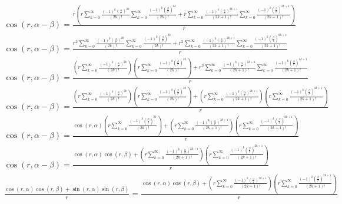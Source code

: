 \documentclass[a4paper,12pt]{report}
\begin{document}
\begin{landscape}
{\begin{gather}
\cos(r,\alpha - \beta) = \frac{r \left(r \sum \limits_{k=0}^{\infty} \frac{(-1)^k \left(\frac{\alpha}{r}\right)^{2k}}{(2k)!} \sum \limits_{k=0}^{\infty} \frac{(-1)^k \left(\frac{\beta}{r}\right)^{2k}}{(2k)!} + r \sum \limits_{k=0}^{\infty} \frac{(-1)^k \left(\frac{\alpha}{r}\right)^{2k+1}}{(2k+1)!} \sum \limits_{k=0}^{\infty} \frac{(-1)^k \left(\frac{\beta}{r}\right)^{2k+1}}{(2k+1)!}\right)}{r} \\
\cos(r,\alpha - \beta) = \frac{r^2 \sum \limits_{k=0}^{\infty} \frac{(-1)^k \left(\frac{\alpha}{r}\right)^{2k}}{(2k)!} \sum \limits_{k=0}^{\infty} \frac{(-1)^k \left(\frac{\beta}{r}\right)^{2k}}{(2k)!} + r^2 \sum \limits_{k=0}^{\infty} \frac{(-1)^k \left(\frac{\alpha}{r}\right)^{2k+1}}{(2k+1)!} \sum \limits_{k=0}^{\infty} \frac{(-1)^k \left(\frac{\beta}{r}\right)^{2k+1}}{(2k+1)!}}{r} \\
\cos(r,\alpha - \beta) = \frac{\left(r \sum \limits_{k=0}^{\infty} \frac{(-1)^k \left(\frac{\alpha}{r}\right)^{2k}}{(2k)!}\right) \left(r \sum \limits_{k=0}^{\infty} \frac{(-1)^k \left(\frac{\beta}{r}\right)^{2k}}{(2k)!}\right) + r^2 \sum \limits_{k=0}^{\infty} \frac{(-1)^k \left(\frac{\alpha}{r}\right)^{2k+1}}{(2k+1)!} \sum \limits_{k=0}^{\infty} \frac{(-1)^k \left(\frac{\beta}{r}\right)^{2k+1}}{(2k+1)!}}{r} \\
\cos(r,\alpha - \beta) = \frac{\left(r \sum \limits_{k=0}^{\infty} \frac{(-1)^k \left(\frac{\alpha}{r}\right)^{2k}}{(2k)!}\right) \left(r \sum \limits_{k=0}^{\infty} \frac{(-1)^k \left(\frac{\beta}{r}\right)^{2k}}{(2k)!}\right) + \left(r \sum \limits_{k=0}^{\infty} \frac{(-1)^k \left(\frac{\alpha}{r}\right)^{2k+1}}{(2k+1)!}\right) \left(r \sum \limits_{k=0}^{\infty} \frac{(-1)^k \left(\frac{\beta}{r}\right)^{2k+1}}{(2k+1)!}\right)}{r} \\
\cos(r,\alpha - \beta) = \frac{\cos(r,\alpha) \left(r \sum \limits_{k=0}^{\infty} \frac{(-1)^k \left(\frac{\beta}{r}\right)^{2k}}{(2k)!}\right) + \left(r \sum \limits_{k=0}^{\infty} \frac{(-1)^k \left(\frac{\alpha}{r}\right)^{2k+1}}{(2k+1)!}\right) \left(r \sum \limits_{k=0}^{\infty} \frac{(-1)^k \left(\frac{\beta}{r}\right)^{2k+1}}{(2k+1)!}\right)}{r} \\
\cos(r,\alpha - \beta) = \frac{\cos(r,\alpha) \cos(r,\beta) + \left(r \sum \limits_{k=0}^{\infty} \frac{(-1)^k \left(\frac{\alpha}{r}\right)^{2k+1}}{(2k+1)!}\right) \left(r \sum \limits_{k=0}^{\infty} \frac{(-1)^k \left(\frac{\beta}{r}\right)^{2k+1}}{(2k+1)!}\right)}{r} \\
\frac{\cos(r,\alpha) \cos(r,\beta) + \sin(r,\alpha) \sin(r,\beta)}{r} = \frac{\cos(r,\alpha) \cos(r,\beta) + \left(r \sum \limits_{k=0}^{\infty} \frac{(-1)^k \left(\frac{\alpha}{r}\right)^{2k+1}}{(2k+1)!}\right) \left(r \sum \limits_{k=0}^{\infty} \frac{(-1)^k \left(\frac{\beta}{r}\right)^{2k+1}}{(2k+1)!}\right)}{r} \\

\end{gather}}
\end{landscape}
\end{document}
